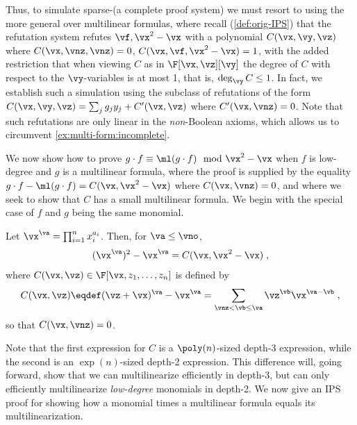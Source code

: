 \documentclass[11pt]{article}
\numberwithin{equation}{section}
\theoremstyle{definition}
\theoremstyle{plain}
\begin{document}
Thus, %
to simulate sparse-\lIPS (a complete proof system) we must resort to using the more general \lbIPS over multilinear formulas, where recall (\autoref{def:orig-IPS}) that the \lbIPS refutation system  refutes $\vf,\vx^2-\vx$ with a polynomial $C(\vx,\vy,\vz)$ where $C(\vx,\vnz,\vnz)=0$, $C(\vx,\vf,\vx^2-\vx)=1$, with the added restriction that when viewing $C$ as in $\F[\vx,\vz][\vy]$  the degree of $C$ with respect to the $\vy$-variables is at most 1, that is, $\deg_\vy C\le 1$. In fact, we  establish such a simulation using the subclass of refutations of the form $C(\vx,\vy,\vz)=\sum_j g_j y_j+C'(\vx,\vz)$ where $C'(\vx,\vnz)=0$.  Note that such refutations are only linear in the \emph{non}-Boolean axioms, which allows us to circumvent \autoref{ex:multi-form:incomplete}.

We now show how to prove $g\cdot f\equiv \ml(g\cdot f) \mod \vx^2-\vx$ when $f$ is low-degree and $g$ is a multilinear formula, where the proof is supplied by the equality $g\cdot f-\ml(g\cdot f)=C(\vx,\vx^2-\vx)$ where $C(\vx,\vnz)=0$, and where we seek to show that $C$ has a small multilinear formula.  We begin with the special case of $f$ and $g$ being the same monomial.

\begin{lemmawp}\label{res:multilin:mon}
        Let $\vx^\va=\prod_{i=1}^n x_i^{a_i}$. Then, for $\va\le \vno$,
        \[
                (\vx^{\va})^2-\vx^{\va}
                =C(\vx,\vx^2-\vx)
                \;,
        \]
        where $C(\vx,\vz)\in\F[\vx,z_1,\ldots,z_n]$ is defined by
        \[
                C(\vx,\vz)
                \eqdef
                (\vz+\vx)^\va-\vx^\va
                =\sum_{\vnz<\vb\le \va} \vz^\vb\vx^{\va-\vb}
                \;,
        \]
        so that $C(\vx,\vnz)=0$.
\end{lemmawp}

Note that the first expression for $C$ is a $\poly(n)$-sized depth-3 expression, while the second is an $\exp(n)$-sized depth-2 expression.  This difference will, going forward, show that we can multilinearize efficiently in depth-3, but can only efficiently multilinearize \emph{low-degree} monomials in depth-2. We now give an IPS proof for showing how a monomial times a multilinear formula equals its multilinearization.
\end{document}
